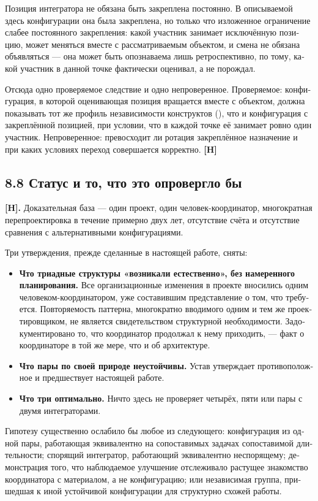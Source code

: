 \begin{russian}
Позиция интегратора не обязана быть закреплена постоянно. В описываемой здесь конфигурации она была закреплена, но только что изложенное ограничение слабее постоянного закрепления: какой участник занимает исключённую позицию, может меняться вместе с рассматриваемым объектом, и смена не обязана объявляться — она может быть опознаваема лишь ретроспективно, по тому, какой участник в данной точке фактически оценивал, а не порождал.

Отсюда одно проверяемое следствие и одно непроверенное. Проверяемое: конфигурация, в которой оценивающая позиция вращается вместе с объектом, должна показывать тот же профиль независимости конструктов (), что и конфигурация с закреплённой позицией, при условии, что в каждой точке её занимает ровно один участник. Непроверенное: превосходит ли ротация закреплённое назначение и при каких условиях переход совершается корректно. \textbf{[H]}


\subsection*{8.8 Статус и то, что это опровергло бы}
\label{sec:ru:8.8}

\textbf{[H].} Доказательная база — один проект, один человек-координатор, многократная перепроектировка в течение примерно двух лет, отсутствие счёта и отсутствие сравнения с альтернативными конфигурациями.

Три утверждения, прежде сделанные в настоящей работе, сняты:

\begin{itemize}
  \item \textbf{Что триадные структуры «возникали естественно», без намеренного планирования.} Все организационные изменения в проекте вносились одним человеком-координатором, уже составившим представление о том, что требуется. Повторяемость паттерна, многократно вводимого одним и тем же проектировщиком, не является свидетельством структурной необходимости. Задокументировано то, что координатор продолжал к нему приходить, — факт о координаторе в той же мере, что и об архитектуре.
  \item \textbf{Что пары по своей природе неустойчивы.} Устав утверждает противоположное и предшествует настоящей работе.
  \item \textbf{Что три оптимально.} Ничто здесь не проверяет четырёх, пяти или пары с двумя интеграторами.
\end{itemize}
Гипотезу существенно ослабило бы любое из следующего: конфигурация из одной пары, работающая эквивалентно на сопоставимых задачах сопоставимой длительности; спорящий интегратор, работающий эквивалентно неспорящему; демонстрация того, что наблюдаемое улучшение отслеживало растущее знакомство координатора с материалом, а не конфигурацию; или независимая группа, пришедшая к иной устойчивой конфигурации для структурно схожей работы.


\end{russian}

